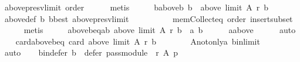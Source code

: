 \begin{isabellebody}
\ above{\isacharunderscore}{\kern0pt}presv{\isacharunderscore}{\kern0pt}limit\ order\isanewline
\ \ \ \ \isamarkupfalse%
\ metis\isanewline
\ \ \isamarkupfalse%
\ \isamarkupfalse%
\ b{\isacharunderscore}{\kern0pt}above{\isacharunderscore}{\kern0pt}b{\isacharcolon}{\kern0pt}\ {\isachardoublequoteopen}b\ {\isasymin}\ above\ {\isacharparenleft}{\kern0pt}limit\ A\ r{\isacharparenright}{\kern0pt}\ b{\isachardoublequoteclose}\isanewline
\ \ \ \ \isamarkupfalse%
\ above{\isacharunderscore}{\kern0pt}def\ b\ b{\isacharunderscore}{\kern0pt}best\ above{\isacharunderscore}{\kern0pt}presv{\isacharunderscore}{\kern0pt}limit\isanewline
\ \ \ \ \ \ \ \ \ \ mem{\isacharunderscore}{\kern0pt}Collect{\isacharunderscore}{\kern0pt}eq\ order\ insert{\isacharunderscore}{\kern0pt}subset\isanewline
\ \ \ \ \isamarkupfalse%
\ metis\isanewline
\ \ \isamarkupfalse%
\ \isamarkupfalse%
\ above{\isacharunderscore}{\kern0pt}b{\isacharunderscore}{\kern0pt}eq{\isacharunderscore}{\kern0pt}ab{\isacharcolon}{\kern0pt}\ {\isachardoublequoteopen}above\ {\isacharparenleft}{\kern0pt}limit\ A\ r{\isacharparenright}{\kern0pt}\ b\ {\isacharequal}{\kern0pt}\ {\isacharbraceleft}{\kern0pt}a{\isacharcomma}{\kern0pt}\ b{\isacharbraceright}{\kern0pt}{\isachardoublequoteclose}\isanewline
\ \ \ \ \isamarkupfalse%
\ a{\isacharunderscore}{\kern0pt}above\isanewline
\ \ \ \ \isamarkupfalse%
\ auto\isanewline
\ \ \isamarkupfalse%
\ card{\isacharunderscore}{\kern0pt}above{\isacharunderscore}{\kern0pt}b{\isacharunderscore}{\kern0pt}eq{\isacharunderscore}{\kern0pt}{}{\isacharcolon}{\kern0pt}\ {\isachardoublequoteopen}card\ {\isacharparenleft}{\kern0pt}above\ {\isacharparenleft}{\kern0pt}limit\ A\ r{\isacharparenright}{\kern0pt}\ b{\isacharparenright}{\kern0pt}\ {\isacharequal}{\kern0pt}\ {}{\isachardoublequoteclose}\isanewline
\ \ \ \ \isamarkupfalse%
\ A{\isacharunderscore}{\kern0pt}not{\isacharunderscore}{\kern0pt}only{\isacharunderscore}{\kern0pt}a\ b{\isacharunderscore}{\kern0pt}in{\isacharunderscore}{\kern0pt}limit\isanewline
\ \ \ \ \isamarkupfalse%
\ auto\isanewline
\ \ \isamarkupfalse%
\ b{\isacharunderscore}{\kern0pt}in{\isacharunderscore}{\kern0pt}defer{\isacharcolon}{\kern0pt}\ {\isachardoublequoteopen}b\ {\isasymin}\ defer\ {\isacharparenleft}{\kern0pt}pass{\isacharunderscore}{\kern0pt}module\ {}\ r{\isacharparenright}{\kern0pt}\ A\ p{\isachardoublequoteclose}\isanewline

\end{isabellebody}
